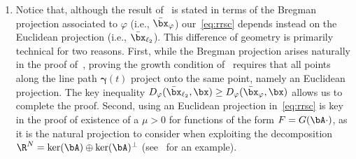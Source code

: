 \documentclass[11pt]{amsart}
\newcommand{\es}[1]{{\color{blue}#1}}
\newcommand{\jc}[1]{{\color{red}#1}}
\begin{document}
\begin{remark}
\begin{enumerate}
\item[(c)] Notice that, although the result of~ is stated in terms of the Bregman projection associated to $\varphi$ (i.e., $\bar \bx_{\varphi}$) our~\cref{eq:rrsc} depends instead on the Euclidean projection (i.e., $\bar\bx_{\ell_2}$). This difference of geometry is primarily technical for two reasons. First, while the Bregman projection arises naturally in the proof of~, proving the growth condition of~ requires that all points along the line path $\boldsymbol{\gamma}(t)$ project onto the same point, namely an Euclidean projection. The key inequality $D_{\varphi}(\bar\bx_{\ell_2},\bx)\geq D_{\varphi}(\bar\bx_{\varphi},\bx)$ allows us to complete the proof. Second, using an Euclidean projection in~\cref{eq:rrsc} is key in the proof of existence of a $\mu>0$ for functions of the form $F=G(\bA\cdot)$, as it is the natural projection to consider when exploiting the decomposition $\R^N = \mathrm{ker}(\bA) \oplus \mathrm{ker}(\bA)^\perp$ (see~ for an example).
\end{enumerate}
\end{remark}
\end{document}
